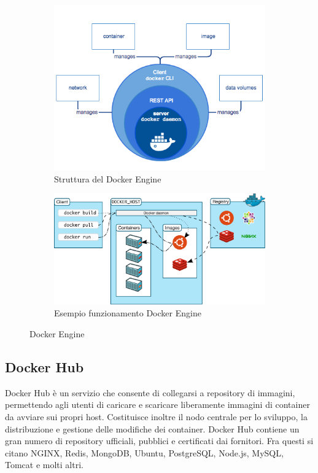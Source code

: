 \begin{figure}[h]
    \begin{subfigure}{0.4\textwidth}
        \centering
        \includegraphics[width=\textwidth]{immagini/engine-components-flow.png}
        \caption{Struttura del Docker Engine}
        \label{fig:docker_engine_a}
    \end{subfigure}
    \begin{subfigure}{0.6\textwidth}
        \centering
        \includegraphics[width=\textwidth]{immagini/architecture.png}
        \caption{Esempio funzionamento Docker Engine}
        \label{fig:docker_engine_b}
    \end{subfigure}
    \caption{Docker Engine}
    \label{fig:docker_engine}
\end{figure}

\subsection{Docker Hub}\label{docker-hub}
Docker Hub è un servizio che consente di collegarsi a repository di immagini, permettendo agli utenti di caricare e scaricare liberamente immagini di container da avviare sui propri host. Costituisce inoltre il nodo centrale per lo sviluppo, la distribuzione e gestione delle modifiche dei container. Docker Hub contiene un gran numero di repository ufficiali, pubblici e certificati dai fornitori. Fra questi si citano NGINX, Redis, MongoDB, Ubuntu, PostgreSQL, Node.js, MySQL, Tomcat e molti altri.


